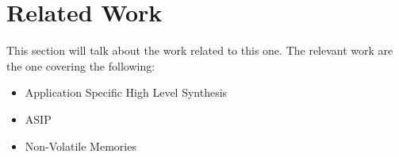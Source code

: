 \section{Related Work}
This section will talk about the work related to this one.
The relevant work are the one covering the following:
\begin{itemize}
	\item Application Specific High Level Synthesis
	\item ASIP
	\item Non-Volatile Memories
\end{itemize}
